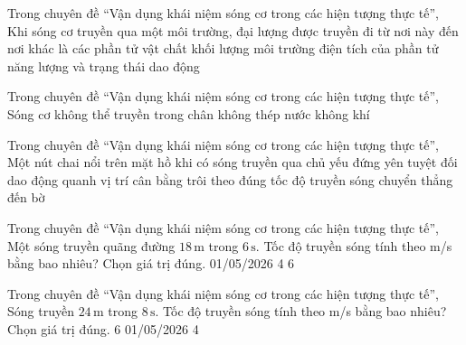 \begin{ex}
Trong chuyên đề “Vận dụng khái niệm sóng cơ trong các hiện tượng thực tế”, Khi sóng cơ truyền qua một môi trường, đại lượng được truyền đi từ nơi này đến nơi khác là
\choice
{các phần tử vật chất}
{khối lượng môi trường}
{điện tích của phần tử}
{\True năng lượng và trạng thái dao động}
\end{ex}

\begin{ex}
Trong chuyên đề “Vận dụng khái niệm sóng cơ trong các hiện tượng thực tế”, Sóng cơ không thể truyền trong
\choice
{\True chân không}
{thép}
{nước}
{không khí}
\end{ex}

\begin{ex}
Trong chuyên đề “Vận dụng khái niệm sóng cơ trong các hiện tượng thực tế”, Một nút chai nổi trên mặt hồ khi có sóng truyền qua chủ yếu
\choice
{đứng yên tuyệt đối}
{\True dao động quanh vị trí cân bằng}
{trôi theo đúng tốc độ truyền sóng}
{chuyển thẳng đến bờ}
\end{ex}

\begin{ex}
Trong chuyên đề “Vận dụng khái niệm sóng cơ trong các hiện tượng thực tế”, Một sóng truyền quãng đường $18\,\text{m}$ trong $6\,\text{s}$. Tốc độ truyền sóng tính theo m/s bằng bao nhiêu? Chọn giá trị đúng.
\choice
{01/05/2026}
{4}
{}
{6}
\end{ex}

\begin{ex}
Trong chuyên đề “Vận dụng khái niệm sóng cơ trong các hiện tượng thực tế”, Sóng truyền $24\,\text{m}$ trong $8\,\text{s}$. Tốc độ truyền sóng tính theo m/s bằng bao nhiêu? Chọn giá trị đúng.
\choice
{6}
{01/05/2026}
{4}
{}
\end{ex}

